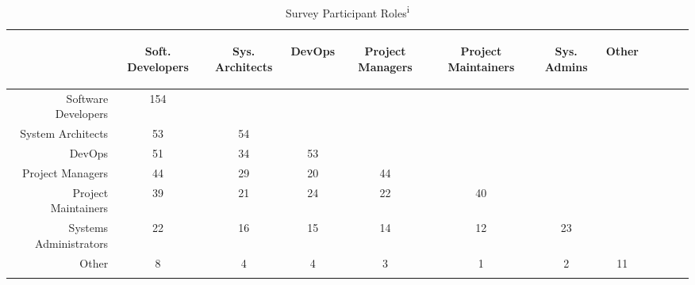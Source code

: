 \begin{table}[!htbp]
\renewcommand{\arraystretch}{1.3}
\caption{Survey Participant Roles\textsuperscript{i}}
\label{survey_roles}
\centering
\begin{tabularx}{0.45\textwidth}{@{}r|*{10}{C}c@{}}
\toprule
\addlinespace[5.4em]
	& \begin{rotate}{45} Soft. Developers \end{rotate} 
	& \begin{rotate}{45} Sys. Architects \end{rotate} 
	& \begin{rotate}{45} DevOps \end{rotate} 
	& \begin{rotate}{45} Project Managers \end{rotate}
	& \begin{rotate}{45} Project Maintainers \end{rotate}
	& \begin{rotate}{45} Sys. Admins \end{rotate}
	& \begin{rotate}{45} Other \end{rotate}\\
\midrule
	Software Developers & 154 & & & & & & \\
	System Architects & 53 & 54 & & & & & \\
	DevOps & 51 & 34 & 53 & & & & \\
	Project Managers & 44 & 29 & 20 & 44 & & & \\
	Project Maintainers & 39 & 21 & 24 & 22 & 40 & & \\
	Systems Administrators & 22 & 16 & 15 & 14 & 12 & 23 & \\
	Other & 8 & 4 & 4 & 3 & 1 & 2 & 11 \\
\bottomrule
\end{tabularx}
\end{table}

